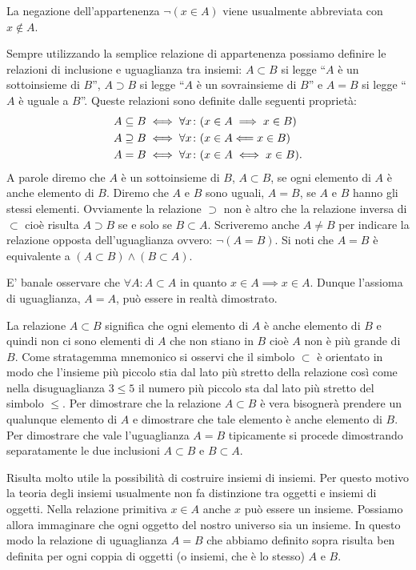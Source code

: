 La negazione dell'appartenenza $\lnot (x \in A)$ viene usualmente
abbreviata con $x \not \in A$.

Sempre utilizzando la semplice relazione di appartenenza possiamo definire
le relazioni di inclusione e uguaglianza tra insiemi:
$A \subset B$ si legge ``$A$ è un sottoinsieme di $B$'',
$A \supset B$ si legge ``$A$ è un sovrainsieme di $B$''
e $A=B$ si legge ``$A$ è uguale a $B$''. 
Queste relazioni sono definite dalle seguenti proprietà:
\begin{align*}
  A \subseteq B &\iff \forall x\colon (x\in A \implies x\in B)\\
  A \supseteq B &\iff \forall x\colon (x\in A \Longleftarrow x\in B)\\
  A = B &\iff \forall x\colon (x\in A \iff x \in B).
\end{align*}
A parole diremo che $A$ è un sottoinsieme di $B$, 
$A \subset B$, se ogni elemento di $A$ è anche elemento di $B$.
Diremo che $A$ e $B$ sono uguali, $A=B$, 
se $A$ e $B$ hanno gli stessi elementi.
Ovviamente la relazione $\supset$ non è altro 
che la relazione inversa di $\subset$ cioè risulta 
$A\supset B$ se e solo se $B\subset A$.
Scriveremo anche $A \neq B$ per indicare
la relazione opposta dell'uguaglianza ovvero: $\lnot(A=B)$.
Si noti che $A=B$ è equivalente a $(A\subset B) \land (B\subset A)$.

E' banale osservare che $\forall A\colon A\subset A$
in quanto $x\in A \implies x\in A$. 
Dunque l'assioma di uguaglianza, $A=A$, può essere in realtà dimostrato.

La relazione $A \subset B$ significa che ogni elemento di $A$ 
è anche elemento di $B$ e quindi non ci sono elementi di $A$ che non stiano 
in $B$ cioè $A$ non è più grande di $B$. 
Come stratagemma mnemonico si osservi che il simbolo 
$\subset$ è orientato in modo che l'insieme più piccolo 
stia dal lato più stretto della relazione così come 
nella disuguaglianza $3 \le 5$ il numero più piccolo 
sta dal lato più stretto del simbolo $\le$.
Per dimostrare che la relazione $A \subset B$ è vera 
bisognerà prendere un qualunque elemento di $A$ e dimostrare 
che tale elemento è anche elemento di $B$.
Per dimostrare che vale l'uguaglianza $A=B$ tipicamente si procede 
dimostrando separatamente le due inclusioni $A\subset B$ e $B\subset A$.

Risulta molto utile la possibilità di costruire insiemi di insiemi.
Per questo motivo la teoria degli insiemi usualmente non fa distinzione
tra oggetti e insiemi di oggetti. Nella relazione primitiva $x\in A$ anche
$x$ può essere un insieme. Possiamo allora immaginare che ogni oggetto del
nostro universo sia un insieme. In questo modo la relazione di uguaglianza $A=B$
che abbiamo definito sopra risulta ben definita per ogni coppia di oggetti
(o insiemi, che è lo stesso) $A$ e $B$.

